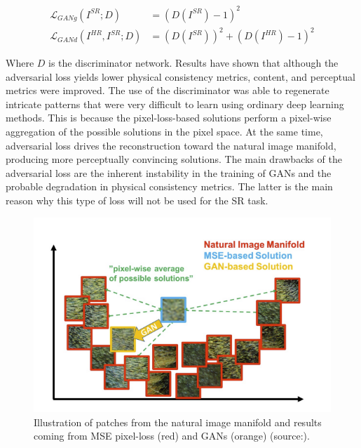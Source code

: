         \begin{equation}
            \begin{aligned}
            \mathcal{L}_{GANg}(I^{SR};D) &= (D(I^{SR}) - 1)^2 \\ 
            \mathcal{L}_{GANd}(I^{HR}, I^{SR};D) &= (D(I^{SR}))^2 + (D(I^{HR}) - 1)^2
            \end{aligned}
        \end{equation}

        Where $D$ is the discriminator network. 
        Results have shown that although the adversarial loss yields lower physical consistency metrics, content, and perceptual metrics were improved. 
        The use of the discriminator was able to regenerate intricate patterns that were very difficult to learn using ordinary deep learning methods. 
        This is because the pixel-loss-based solutions perform a pixel-wise aggregation of the possible solutions in the pixel space. At the same time, adversarial loss drives the reconstruction toward the natural image manifold, producing more perceptually convincing solutions. 
        The main drawbacks of the adversarial loss are the inherent instability in the training of GANs and the probable degradation in physical consistency metrics.
        The latter is the main reason why this type of loss will not be used for the SR task.

        \begin{figure}[H]
            \centering
            \includegraphics[width=\textwidth]{Includes/2-gans-natural-manifold.png}
            \caption{Illustration of patches from the natural image manifold and results coming from MSE pixel-loss (red) and GANs (orange) (source:\cite{ledig2017photorealistic}).}
            \label{fig:2-gans-natural-manifold}
        \end{figure}


